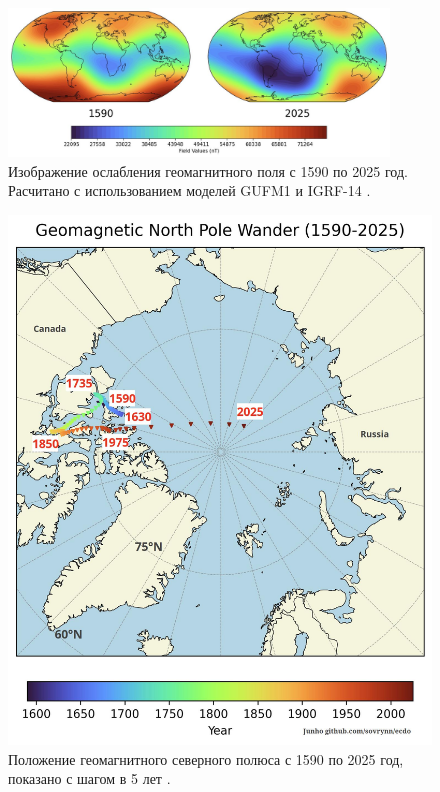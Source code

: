 \documentclass[10pt,twocolumn,letterpaper]{article}
\begin{document}
\begin{figure}[t]
\begin{center}
\includegraphics[width=0.9\textwidth]{saa.jpg}
\end{center}
   \caption{Изображение ослабления геомагнитного поля с 1590 по 2025 год. Расчитано с использованием моделей GUFM1 и IGRF-14 \cite{125,126}.}
\label{fig:14}
\end{figure}

\begin{figure}[t]
\begin{center}
   \includegraphics[width=1\linewidth]{npw.jpg}
\end{center}
   \caption{Положение геомагнитного северного полюса с 1590 по 2025 год, показано с шагом в 5 лет \cite{142}.}
\label{fig:13}
\label{fig:onecol}
\end{figure}
\end{document}
